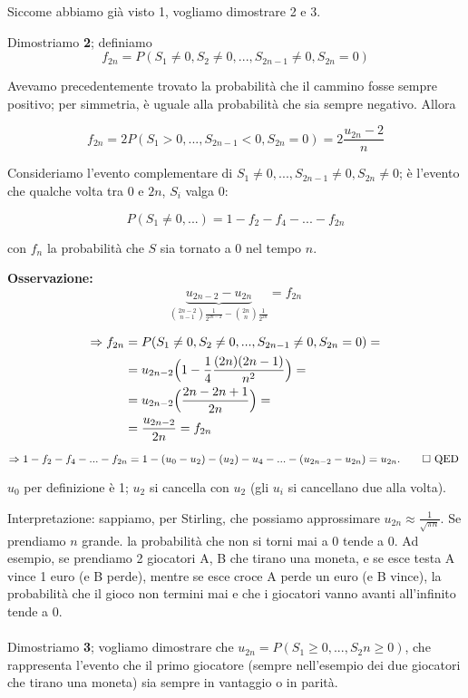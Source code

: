 \documentclass[a4paper,12pt]{book}
\begin{document}
Siccome abbiamo già visto 1, vogliamo dimostrare 2 e 3. 

Dimostriamo \textbf{2}; definiamo 
$$ f_{2n} = P(S_1 \ne 0, S_2 \ne 0, ..., S_{2n-1} \ne 0, S_{2n} = 0) $$

Avevamo precedentemente trovato la probabilità che il cammino fosse sempre positivo; per simmetria, è uguale alla probabilità che sia sempre negativo. Allora

$$ f_{2n} = 2P(S_1 > 0, ..., S_{2n-1} < 0, S_{2n} = 0) = 2\frac{u_{2n}-2}{n} $$

Consideriamo l'evento complementare di $S_1 \ne 0, ..., S_{2n-1} \ne 0, S_{2n} \ne 0$; è l'evento che qualche volta tra 0 e $ 2n $, $ S_i $ valga 0:

$$ P(S_1 \ne 0, ...) = 1 - f_2 - f_4 - ... - f_{2n} $$

con $ f_n $ la probabilità che $ S $ sia tornato a 0 nel tempo $ n $. 

\textbf{Osservazione:} 
$$ \underbrace{u_{2n-2} - u_{2n}}_{\displaystyle \binom{2n-2}{n-1} \frac{1}{2^{2n-2}} - \binom{2n}{n} \frac{1}{2^{2n}}} = f_{2n} $$

\begin{align*}
	\Rightarrow f_{2n} & = P(S_1 \ne 0, S_2 \ne 0, ..., S_{2n-1} \ne 0, S_{2n} = 0) = \\
	& = u_{2n-2} \Bigl(  1 - \frac{1}{4} \frac{(2n)(2n-1)}{n^2} \Bigr)  = \\
	& = u_{2n-2} \Bigl(\frac{2n - 2n + 1}{2n} \Bigr) = \\
	& = \frac{u_{2n-2}}{2n} = f_{2n} 
\end{align*}

$$ \Rightarrow 1 - f_2 - f_4 - ... - f_{2n} = 1 - (u_0 - u_2) - (u_2) - u_4 - ... - (u_{2n-2} - u_{2n}) = u_{2n}. \qed \text{ QED }$$ 

$ u_0 $ per definizione è 1; $ u_2 $ si cancella con $ u_2 $ (gli $ u_i $ si cancellano due alla volta).

Interpretazione: sappiamo, per Stirling, che possiamo approssimare $ u_{2n} \approx \frac{1}{\sqrt{\pi n}} $. Se prendiamo $ n $ grande. la probabilità che non si torni mai a 0 tende a 0. Ad esempio, se prendiamo 2 giocatori A, B che tirano una moneta, e se esce testa A vince 1 euro (e B perde), mentre se esce croce A perde un euro (e B vince), la probabilità che il gioco non termini mai e che i giocatori vanno avanti all'infinito tende a 0. 
\\
\\
Dimostriamo \textbf{3}; vogliamo dimostrare che $ u_{2n} = P(S_1 \ge 0, ..., S_2n \ge 0 ) $, che rappresenta l'evento che il primo giocatore (sempre nell'esempio dei due giocatori che tirano una moneta) sia sempre in vantaggio o in parità. 
\end{document}
